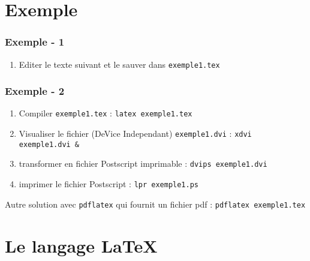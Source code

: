 \section{Exemple}

\begin{frame}[fragile]
\frametitle{Exemple - 1}
\begin{enumerate}
\item Editer le texte suivant et le sauver dans \texttt{exemple1.tex}
\small{

}
\end{enumerate}
\end{frame}


\begin{frame}
\frametitle{Exemple - 2}
\begin{enumerate}
\addtocounter{enumi}{1}
\item Compiler \texttt{exemple1.tex} : \texttt{latex exemple1.tex}
\item Visualiser le fichier (DeVice Independant) \texttt{exemple1.dvi} :
  \texttt{xdvi exemple1.dvi \&}
\item transformer en fichier Postscript imprimable : \texttt{dvips exemple1.dvi}
\item imprimer le fichier Postscript : \texttt{lpr exemple1.ps}
\end{enumerate}

\medskip 

Autre solution avec \texttt{pdflatex} qui fournit un fichier pdf :
\texttt{pdflatex exemple1.tex}
\end{frame}



\section{Le langage \LaTeX}


